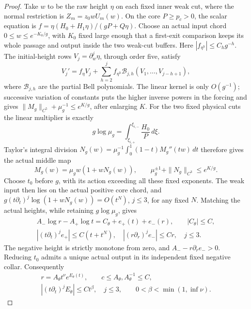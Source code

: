 \begin{proof}
Take \(w\) to be the raw height \(\eta\) on each fixed inner
weak cut, where the normal restriction is \(Z_m=z_0wU_m(w)\).
On the core \(P\ge p_c>0\),
the scalar equation is
\(f=\eta(H_0+H_1\eta)/(gP+Q\eta)\).
Choose an actual input chord \(0\le w\le e^{-K_0/g}\), with
\(K_0\) fixed large enough that a first-exit comparison keeps its
whole passage and output inside the two weak-cut buffers.
Here \(|f_{\eta^h}|\le C_hg^{-h}\). The initial-height rows
\(V_j=\partial_w^j\eta\), through order five, satisfy
\[
 V_j'=f_\eta V_j+
 \sum_{h=2}^j f_{\eta^h}\mathcal B_{j,h}(V_1,\ldots,V_{j-h+1}),
\]
where \(\mathcal B_{j,h}\) are the partial Bell polynomials.
The linear kernel is only \(O(g^{-1})\); successive variation of
constants puts the higher inverse powers in the forcing and gives
\mbox{\(\|M_g\|_{C^5}+\mu_g^{-1}\le e^{K/g}\)}, after enlarging \(K\).
For the two fixed physical cuts the linear multiplier is exactly
\begin{equation}\label{deg:negative-core-multiplier}
 g\log\mu_g=\int_{\xi_{i,+}}^{\xi_{i,-}}\frac{H_0}{P}\,d\xi .
\end{equation}
Taylor's integral division
\(N_g(w)=\mu_g^{-1}\int_0^1(1-t)M_g''(tw)\,dt\)
therefore gives the actual middle map
\begin{equation}\label{deg:negative-gamma-middle}
 M_g(w)=\mu_gw(1+wN_g(w)),\qquad
 \mu_g^{\pm1}+\|N_g\|_{C^3}\le e^{K/g}.
\end{equation}
Choose \(t_0\) before \(g\), with its action exceeding all these fixed
exponents. The weak input then lies on the actual positive core chord,
and \(g(t\partial_t)^j\log(1+wN_g(w))=O(t^N)\), \(j\le3\),
for any fixed \(N\). Matching the actual heights, while retaining
\(g\log\mu_g\), gives
\begin{equation}\label{deg:negative-gamma-matching}
 \begin{gathered}
 A_-\log r-A_+\log t=C_\theta+e_+(t)+e_-(r),\qquad |C_\theta|\le C,\\
 |(t\partial_t)^je_+|\le C(t+t^N),\quad
 |(r\partial_r)^je_-|\le Cr,\quad j\le3.
 \end{gathered}
\end{equation}
The negative height is strictly monotone from zero, and
\(A_--r\partial_re_->0\). Reducing \(t_0\) admits a unique actual
output in its independent fixed negative collar. Consequently
\begin{equation}\label{deg:negative-gamma-power}
 \begin{gathered}
 r=A_\theta t^\nu e^{E_\theta(t)},\qquad c\le A_\theta,A_\theta^{-1}\le C,\\
 |(t\partial_t)^jE_\theta|\le Ct^\beta,\quad j\le3,
 \qquad0<\beta<\min(1,\inf\nu).
 \end{gathered}
\end{equation}


\end{proof}
